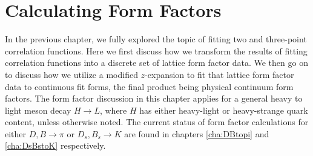\chapter{Calculating Form Factors}\label{cha:form_factors}
In the previous chapter, we fully explored the topic of fitting two and three-point correlation functions.  Here we first discuss how we transform the results of fitting correlation functions into a discrete set of lattice form factor data.  We then go on to discuss how we utilize a modified $z$-expansion to fit that lattice form factor data to continuous fit forms, the final product being physical continuum form factors.  The form factor discussion in this chapter applies for a general heavy to light meson decay $H\rightarrow L$, where $H$ has either heavy-light or heavy-strange quark content, unless otherwise noted.  The current status of form factor calculations for either $D,B\rightarrow \pi$ or $D_s,B_s \rightarrow K$ are found in chapters \ref{cha:DBtopi} and \ref{cha:DsBstoK} respectively.

